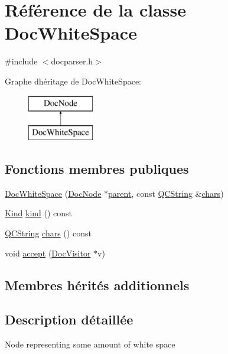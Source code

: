 \hypertarget{class_doc_white_space}{}\section{Référence de la classe Doc\+White\+Space}
\label{class_doc_white_space}


{\ttfamily \#include $<$docparser.\+h$>$}

Graphe d\textquotesingle{}héritage de Doc\+White\+Space\+:\begin{figure}[H]
\begin{center}
\leavevmode
\includegraphics[height=2.000000cm]{class_doc_white_space}
\end{center}
\end{figure}
\subsection*{Fonctions membres publiques}
\begin{DoxyCompactItemize}
\item 
\hyperlink{class_doc_white_space_afbeedad7743b79f86b5ababfb2186f71}{Doc\+White\+Space} (\hyperlink{class_doc_node}{Doc\+Node} $\ast$\hyperlink{class_doc_node_a990d8b983962776a647e6231d38bd329}{parent}, const \hyperlink{class_q_c_string}{Q\+C\+String} \&\hyperlink{class_doc_white_space_a511183ca423a5c889342fd8ad914022d}{chars})
\item 
\hyperlink{class_doc_node_aebd16e89ca590d84cbd40543ea5faadb}{Kind} \hyperlink{class_doc_white_space_a35036e443e5fd91b1414d898a4d545e8}{kind} () const 
\item 
\hyperlink{class_q_c_string}{Q\+C\+String} \hyperlink{class_doc_white_space_a511183ca423a5c889342fd8ad914022d}{chars} () const 
\item 
void \hyperlink{class_doc_white_space_af3830207874d11f5e9fd193fe875d0fa}{accept} (\hyperlink{class_doc_visitor}{Doc\+Visitor} $\ast$v)
\end{DoxyCompactItemize}
\subsection*{Membres hérités additionnels}


\subsection{Description détaillée}
Node representing some amount of white space 

